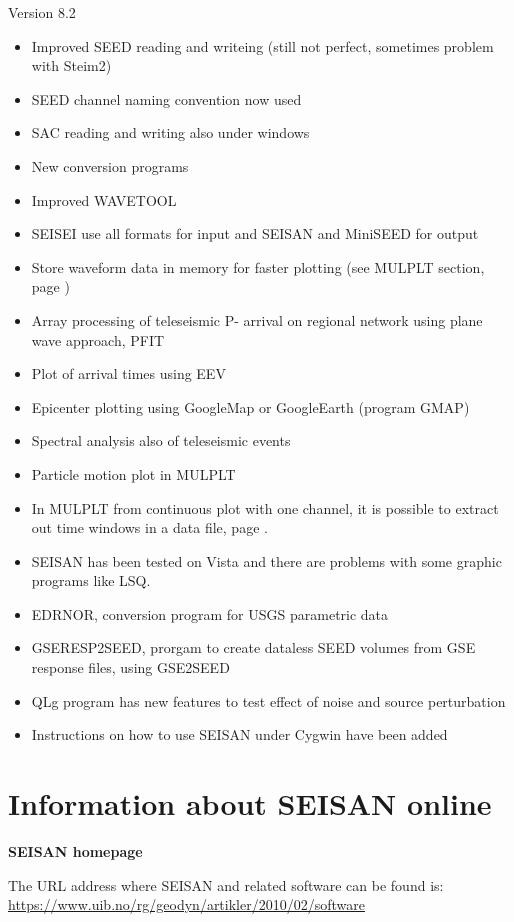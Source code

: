 Version 8.2 
\begin{itemize}
\item Improved  SEED reading and writeing (still not perfect, sometimes problem with Steim2) 
\item SEED channel naming convention now used 
\item SAC reading and writing also under windows 
\item New conversion programs 
\item Improved WAVETOOL 
\item SEISEI use all formats for input and SEISAN and MiniSEED for output 
\item Store waveform data in memory for faster plotting  (see MULPLT section, 
page \pageref{sect:mulplt}) 
\item Array processing of teleseismic P- arrival on regional network using plane wave approach, PFIT 
\item Plot of arrival times using EEV 
\item Epicenter plotting using GoogleMap or GoogleEarth (program GMAP) 
\item Spectral analysis also of teleseismic events 
\item Particle motion plot in MULPLT 
\item In MULPLT from continuous plot with one channel, it is possible 
to extract out time windows in a data file, page \pageref{page:mulplt.ext}.
\item SEISAN has been tested on Vista and there are problems with some graphic programs like LSQ. 
\item EDRNOR, conversion program for USGS parametric data 
\item GSERESP2SEED, prorgam to create dataless SEED volumes from GSE response files, \newline
using GSE2SEED 
\item QLg program has new features to test effect of noise and source perturbation 
\item Instructions on how to use SEISAN under Cygwin have been added 
\end{itemize}

\section{Information about SEISAN online}
\noindent
\textbf{SEISAN homepage}

The URL address where SEISAN and related software can be found is: 
\newline
\url{https://www.uib.no/rg/geodyn/artikler/2010/02/software}

